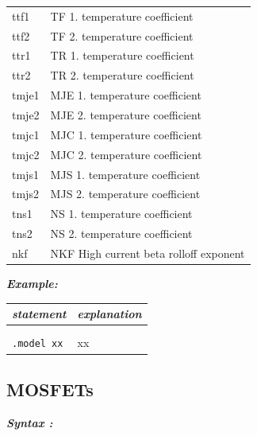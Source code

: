 \begin{longtable}{l l}
{\small ttf1} & {\small TF 1. temperature coefficient} \\ 
{\small ttf2} & {\small TF 2. temperature coefficient} \\ 
{\small ttr1} & {\small TR 1. temperature coefficient} \\ 
{\small ttr2} & {\small TR 2. temperature coefficient} \\ 
{\small tmje1} & {\small MJE 1. temperature coefficient} \\
{\small tmje2} & {\small MJE 2. temperature coefficient} \\
{\small tmjc1} & {\small MJC 1. temperature coefficient} \\
{\small tmjc2} & {\small MJC 2. temperature coefficient} \\
{\small tmjs1} & {\small MJS 1. temperature coefficient} \\
{\small tmjs2} & {\small MJS 2. temperature coefficient} \\
{\small tns1} & {\small NS 1. temperature coefficient} \\
{\small tns2} & {\small NS 2. temperature coefficient} \\
{\small nkf} & {\small NKF High current beta rolloff exponent} 
\end{longtable}																				


\textbf{\textit{Example:}}

\begin{longtable}{l l}
\textit{statement} & \textit{explanation} \\ \hline \\ %
			\begin{minipage}{15em}{\texttt{xx}\\ 
			\texttt{.model xx}}\end{minipage}
			& \begin{minipage}{15em}{{\small xx}}\end{minipage} 
\end{longtable}

\newpage
\subsection{MOSFETs}
\label{subsec_sceadm_mosfets}

\textbf{\textit{Syntax :}}


